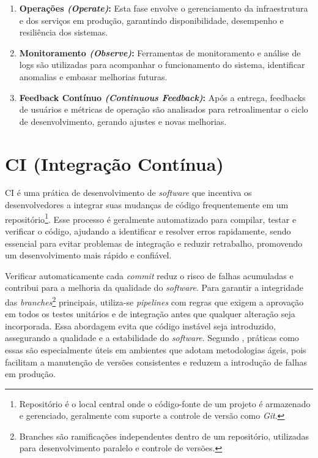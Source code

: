 \begin{enumerate}
\item \textbf{Operações \textit{(Operate)}:} Esta fase envolve o gerenciamento da infraestrutura e dos serviços em produção, garantindo disponibilidade, desempenho e resiliência dos sistemas.

\item \textbf{Monitoramento \textit{(Observe)}:} Ferramentas de monitoramento e análise de logs são utilizadas para acompanhar o funcionamento do sistema, identificar anomalias e embasar melhorias futuras.

\item \textbf{Feedback Contínuo \textit{(Continuous Feedback)}:} Após a entrega, feedbacks de usuários e métricas de operação são analisados para retroalimentar o ciclo de desenvolvimento, gerando ajustes e novas melhorias.
\end{enumerate}

\section{CI (Integração Contínua)}

CI é uma prática de desenvolvimento de \textit{software} que incentiva os desenvolvedores a integrar suas mudanças de código frequentemente em um repositório\footnote{Repositório é o local central onde o código-fonte de um projeto é armazenado e gerenciado, geralmente com suporte a controle de versão como \textit{Git}.}. Esse processo é geralmente automatizado para compilar, testar e verificar o código, ajudando a identificar e resolver erros rapidamente, sendo essencial para evitar problemas de integração e reduzir retrabalho, promovendo um desenvolvimento mais rápido e confiável. 


Verificar automaticamente cada \textit{commit} reduz o risco de falhas acumuladas e contribui para a melhoria da qualidade do \textit{software}. Para garantir a integridade das \textit{branches}\footnote{Branches são ramificações independentes dentro de um repositório, utilizadas para desenvolvimento paralelo e controle de versões.} principais, utiliza-se \textit{pipelines} com regras que exigem a aprovação em todos os testes unitários e de integração antes que qualquer alteração seja incorporada. Essa abordagem evita que código instável seja introduzido, assegurando a qualidade e a estabilidade do \textit{software}. Segundo \cite{Fowler2024}, práticas como essas são especialmente úteis em ambientes que adotam metodologias ágeis, pois facilitam a manutenção de versões consistentes e reduzem a introdução de falhas em produção.

